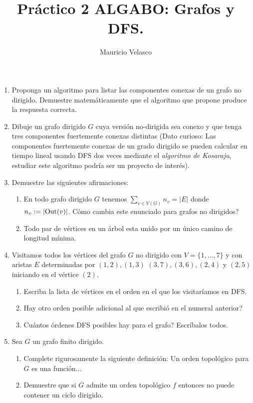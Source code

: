 \documentclass[12pt, a4paper]{article}
\date{}
\begin{document}
\title{Pr\'actico 2 ALGABO: Grafos y DFS.}
\author{Mauricio Velasco}
\maketitle{}
\begin{enumerate} 

\item Proponga un algoritmo para listar las componentes conexas de un grafo no dirigido. Demuestre matem\'aticamente que el algoritmo que propone produce la respuesta correcta.

\item Dibuje un grafo dirigido $G$ cuya versi\'on no-dirigida sea conexo y que tenga tres componentes fuertemente conexas distintas (Dato curioso: Las componentes fuertemente conexas de un grado dirigido se pueden calcular en tiempo lineal usando DFS dos veces mediante el {\it algoritmo de Kosaraju}, estudiar este algoritmo podr\'ia ser un proyecto de inter\'es). 


\item Demuestre las siguientes afirmaciones:
\begin{enumerate}
\item En todo grafo dirigido $G$ tenemos $\sum_{v\in V(G)} n_v=|E|$ donde $n_v:=|{\rm Out}(v)|$. C\'omo cambia este enunciado para grafos no dirigidos?
\item Todo par de v\'ertices en un \'arbol esta unido por un \'unico camino de longitud m\'inima.  
\end{enumerate}

\item Visitamos todos los v\'ertices del grafo $G$ no dirigido con $V=\{1,\dots, 7\}$ y con aristas $E$ determinadas por $(1,2), (1,3)$ $(3,7), (3,6), (2,4)$ y $(2,5)$ iniciando en el v\'ertice $(2)$.
\begin{enumerate}
\item Escriba la lista de v\'ertices en el orden en el que los visitar\'iamos en DFS.
\item Hay otro orden posible adicional al que escribi\'o en el numeral anterior?
\item Cu\'antos \'ordenes DFS posibles hay para el grafo? Escr\'ibalos todos.
\end{enumerate}


\item Sea $G$ un grafo finito dirigido.
\begin{enumerate}
\item Complete rigurosamente la siguiente definici\'on: Un orden topol\'ogico para $G$ es una funci\'on... 
\item Demuestre que si $G$ admite un orden topol\'ogico $f$ entonces no puede contener un ciclo dirigido.
\end{enumerate}



\end{enumerate}
\end{document}
